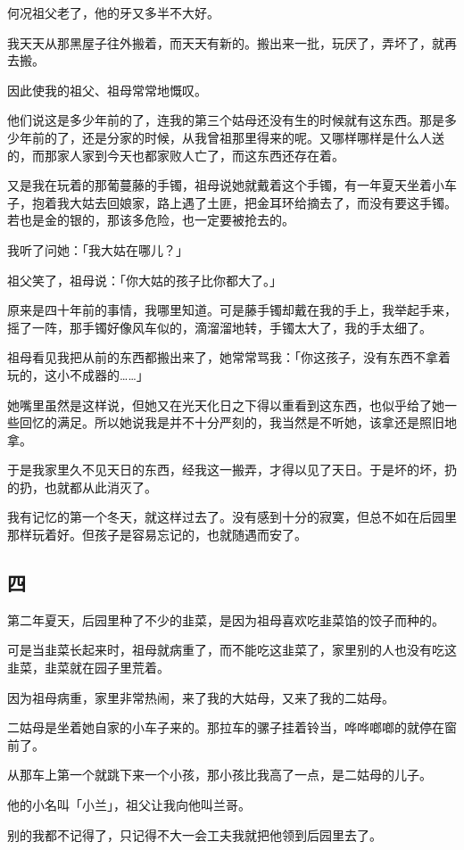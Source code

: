 \documentclass[UTF8]{ctexart}
\begin{document}
何况祖父老了，他的牙又多半不大好。

我天天从那黑屋子往外搬着，而天天有新的。搬出来一批，玩厌了，弄坏了，就再去搬。

因此使我的祖父、祖母常常地慨叹。

他们说这是多少年前的了，连我的第三个姑母还没有生的时候就有这东西。那是多少年前的了，还是分家的时候，从我曾祖那里得来的呢。又哪样哪样是什么人送的，而那家人家到今天也都家败人亡了，而这东西还存在着。

又是我在玩着的那葡蔓藤的手镯，祖母说她就戴着这个手镯，有一年夏天坐着小车子，抱着我大姑去回娘家，路上遇了土匪，把金耳环给摘去了，而没有要这手镯。若也是金的银的，那该多危险，也一定要被抢去的。

我听了问她：「我大姑在哪儿？」

祖父笑了，祖母说：「你大姑的孩子比你都大了。」

原来是四十年前的事情，我哪里知道。可是藤手镯却戴在我的手上，我举起手来，摇了一阵，那手镯好像风车似的，滴溜溜地转，手镯太大了，我的手太细了。

祖母看见我把从前的东西都搬出来了，她常常骂我：「你这孩子，没有东西不拿着玩的，这小不成器的……」

她嘴里虽然是这样说，但她又在光天化日之下得以重看到这东西，也似乎给了她一些回忆的满足。所以她说我是并不十分严刻的，我当然是不听她，该拿还是照旧地拿。

于是我家里久不见天日的东西，经我这一搬弄，才得以见了天日。于是坏的坏，扔的扔，也就都从此消灭了。

我有记忆的第一个冬天，就这样过去了。没有感到十分的寂寞，但总不如在后园里那样玩着好。但{孩子是容易忘记的}，也就随遇而安了。

\subsection{四}

第二年夏天，后园里种了不少的韭菜，是因为祖母喜欢吃韭菜馅的饺子而种的。

可是当韭菜长起来时，祖母就病重了，而不能吃这韭菜了，家里别的人也没有吃这韭菜，韭菜就在园子里荒着。

因为祖母病重，家里非常热闹，来了我的大姑母，又来了我的二姑母。

二姑母是坐着她自家的小车子来的。那拉车的骡子挂着铃当，哗哗啷啷的就停在窗前了。

从那车上第一个就跳下来一个小孩，那小孩比我高了一点，是二姑母的儿子。

他的小名叫「小兰」，祖父让我向他叫兰哥。

别的我都不记得了，只记得不大一会工夫我就把他领到后园里去了。
\end{document}

